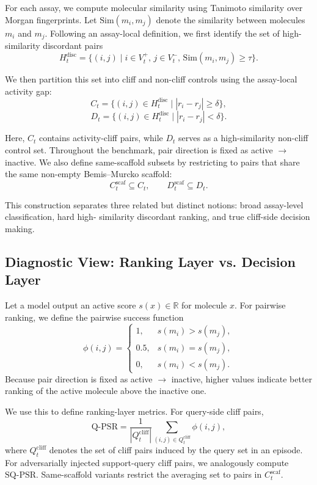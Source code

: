 \documentclass{article}
\begin{document}
For each assay, we compute molecular similarity using Tanimoto similarity over Morgan fingerprints. Let
$\mathrm{Sim}(m_i,m_j)$ denote the similarity between molecules $m_i$ and $m_j$. Following an assay-local
definition, we first identify the set of high-similarity discordant pairs
\[
H_t^{\mathrm{disc}} = \{(i,j)\mid i \in V_t^+,\, j \in V_t^-,\, \mathrm{Sim}(m_i,m_j) \ge \tau \}.
\]

We then partition this set into cliff and non-cliff controls using the assay-local activity gap:
\[
C_t = \{(i,j) \in H_t^{\mathrm{disc}} \mid |r_i-r_j| \ge \delta \},
\]
\[
D_t = \{(i,j) \in H_t^{\mathrm{disc}} \mid |r_i-r_j| < \delta \}.
\]

Here, $C_t$ contains activity-cliff pairs, while $D_t$ serves as a high-similarity non-cliff control set.
Throughout the benchmark, pair direction is fixed as active $\rightarrow$ inactive. We also define same-scaffold
subsets by restricting to pairs that share the same non-empty Bemis--Murcko scaffold:
\[
C_t^{\mathrm{scaf}} \subseteq C_t, \qquad D_t^{\mathrm{scaf}} \subseteq D_t.
\]

This construction separates three related but distinct notions: broad assay-level classification, hard high-
similarity discordant ranking, and true cliff-side decision making.

\subsection{Diagnostic View: Ranking Layer vs. Decision Layer}

Let a model output an active score $s(x) \in \mathbb{R}$ for molecule $x$. For pairwise ranking, we define the
pairwise success function
\[
\phi(i,j)=
\begin{cases}
1, & s(m_i) > s(m_j),\\
0.5, & s(m_i) = s(m_j),\\
0, & s(m_i) < s(m_j).
\end{cases}
\]
Because pair direction is fixed as active $\rightarrow$ inactive, higher values indicate better ranking of the
active molecule above the inactive one.

We use this to define ranking-layer metrics. For query-side cliff pairs,
\[
\mathrm{Q\mbox{-}PSR} = \frac{1}{|Q_t^{\mathrm{cliff}}|} \sum_{(i,j)\in Q_t^{\mathrm{cliff}}} \phi(i,j),
\]
where $Q_t^{\mathrm{cliff}}$ denotes the set of cliff pairs induced by the query set in an episode. For
adversarially injected support-query cliff pairs, we analogously compute $\mathrm{SQ\mbox{-}PSR}$. Same-scaffold
variants restrict the averaging set to pairs in $C_t^{\mathrm{scaf}}$.
\end{document}
